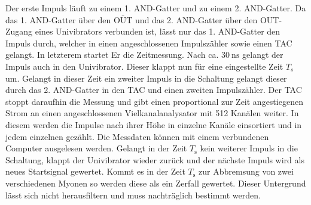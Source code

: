     Der erste Impuls läuft zu einem 1. AND-Gatter und zu einem 2. AND-Gatter. Da das 1. AND-Gatter über den $\bar{\text{OUT}}$  und das 2. AND-Gatter über den OUT-Zugang eines Univibrators verbunden ist, lässt nur das 1. AND-Gatter den Impuls durch, welcher in einen angeschlossenen Impulszähler sowie einen TAC gelangt. In letzterem startet Er die Zeitmessung. Nach ca. $\SI{30}{\nano\second}$ gelangt der Impuls auch in den Univibrator. Dieser klappt nun für eine eingestellte Zeit $T_s$ um. Gelangt in dieser Zeit ein zweiter Impuls in die Schaltung gelangt dieser durch das 2. AND-Gatter in den TAC und einen zweiten Impulszähler. Der TAC stoppt daraufhin die Messung und gibt einen proportional zur Zeit angestiegenen Strom an einen angeschlossenen Vielkanalanalysator mit 512 Kanälen weiter. In diesem werden die Impulse nach ihrer Höhe in einzelne Kanäle einsortiert und in jedem einzelnen gezählt. Die Messdaten können mit einem verbundenen Computer ausgelesen werden. Gelangt in der Zeit $T_\text{s}$ kein weiterer Impuls in die Schaltung, klappt der Univibrator wieder zurück und der nächste Impuls wird als neues Startsignal gewertet. Kommt es in der Zeit $T_\text{s}$ zur Abbremsung von zwei verschiedenen Myonen so werden diese als ein Zerfall gewertet. Dieser Untergrund lässt sich nicht herausfiltern und muss nachträglich bestimmt werden.          